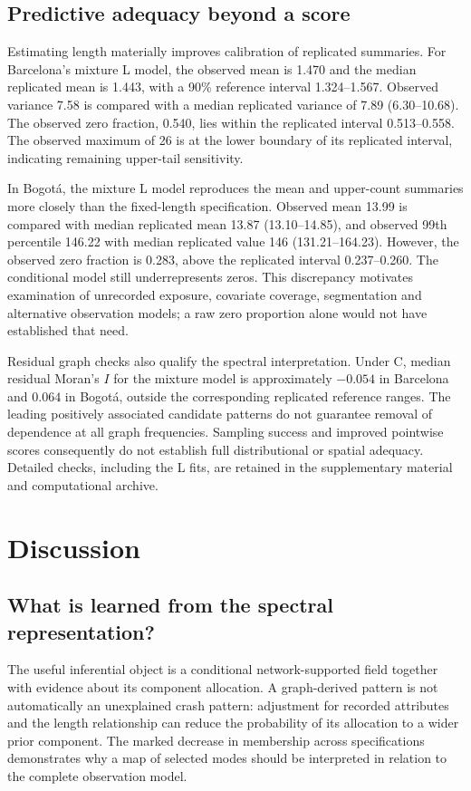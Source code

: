 \documentclass[11pt]{article}
\begin{document}
\FloatBarrier
\subsection{Predictive adequacy beyond a score}
Estimating length materially improves calibration of replicated summaries. For Barcelona's mixture L model, the observed mean is 1.470 and the median replicated mean is 1.443, with a 90\% reference interval 1.324--1.567. Observed variance 7.58 is compared with a median replicated variance of 7.89 (6.30--10.68). The observed zero fraction, 0.540, lies within the replicated interval 0.513--0.558. The observed maximum of 26 is at the lower boundary of its replicated interval, indicating remaining upper-tail sensitivity.

In Bogot\'a, the mixture L model reproduces the mean and upper-count summaries more closely than the fixed-length specification. Observed mean 13.99 is compared with median replicated mean 13.87 (13.10--14.85), and observed 99th percentile 146.22 with median replicated value 146 (131.21--164.23). However, the observed zero fraction is 0.283, above the replicated interval 0.237--0.260. The conditional model still underrepresents zeros. This discrepancy motivates examination of unrecorded exposure, covariate coverage, segmentation and alternative observation models; a raw zero proportion alone would not have established that need.

Residual graph checks also qualify the spectral interpretation. Under C, median residual Moran's $I$ for the mixture model is approximately $-0.054$ in Barcelona and $0.064$ in Bogot\'a, outside the corresponding replicated reference ranges. The leading positively associated candidate patterns do not guarantee removal of dependence at all graph frequencies. Sampling success and improved pointwise scores consequently do not establish full distributional or spatial adequacy. Detailed checks, including the L fits, are retained in the supplementary material and computational archive.

\section{Discussion}
\subsection{What is learned from the spectral representation?}
The useful inferential object is a conditional network-supported field together with evidence about its component allocation. A graph-derived pattern is not automatically an unexplained crash pattern: adjustment for recorded attributes and the length relationship can reduce the probability of its allocation to a wider prior component. The marked decrease in membership across specifications demonstrates why a map of selected modes should be interpreted in relation to the complete observation model.
\end{document}
